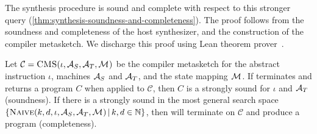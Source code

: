 The \jitsynth synthesis procedure is sound and complete with respect to this
stronger query (\autoref{thm:synthesis-soundness-and-completeness}). The proof
follows from the soundness and completeness of the host synthesizer, and the
construction of the compiler metasketch. We discharge this proof using Lean theorem prover~\cite{moura:lean}.

\begin{theorem}\label{thm:synthesis-soundness-and-completeness}
  Let $\mathcal{C} = \CMS(\iota, \arm_S, \arm_T, \Map)$ be the compiler
  metasketch for the abstract instruction $\iota$, machines $\mathcal{A}_S$ and
  $\mathcal{A}_T$, and the state mapping $\mathcal{M}_{}$. If \jitsynth terminates and returns a
  program $C$ when applied to $\mathcal{C}$, then $C$ is a strongly sound
  \minicompiler for $\iota$ and $\mathcal{A}_T$ (soundness). If there is a strongly
  sound \minicompiler in the most general search space $\{\Naive(k, d, \iota,
  \arm_S, \arm_T, \Map) \,|\, k, d\in \mathbb{N}\}$, then \jitsynth will terminate on
  $\mathcal{C}$ and produce a program (completeness). 
\end{theorem}
